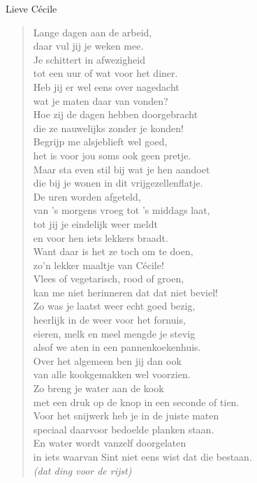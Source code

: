 \documentclass[12pt]{brief}
\date{6 december 2007}
\begin{document}
\begin{letter}{Lieve C\'ecile}

\opening{}


\begin{verse}

Lange dagen aan de arbeid,\\
daar vul jij je weken mee.\\
Je schittert in afwezigheid\\
tot een uur of wat voor het diner.\\
Heb jij er wel eens over nagedacht\\
wat je maten daar van vonden?\\
Hoe zij de dagen hebben doorgebracht\\
die ze nauwelijks zonder je konden!\\[1.5em]

Begrijp me alsjeblieft wel goed,\\
het is voor jou soms ook geen pretje.\\
Maar sta even stil bij wat je hen aandoet\\
die bij je wonen in dit vrijgezellenflatje.\\
De uren worden afgeteld,\\
van 's morgens vroeg tot 's middags laat,\\
tot jij je eindelijk weer meldt\\
en voor hen iets lekkers braadt.\\[1.5em]

Want daar is het ze toch om te doen,\\
zo'n lekker maaltje van C\'ecile!\\
Vlees of vegetarisch, rood of groen,\\
kan me niet herinneren dat dat niet beviel!\\
Zo was je laatst weer echt goed bezig,\\
heerlijk in de weer voor het fornuis,\\
eieren, melk en meel mengde je stevig\\
alsof we aten in een pannenkoekenhuis.\\[1.5em]

Over het algemeen ben jij dan ook\\
van alle kookgemakken wel voorzien.\\
Zo breng je water aan de kook\\
met een druk op de knop in een seconde of tien.\\
Voor het snijwerk heb je in de juiste maten\\
speciaal daarvoor bedoelde planken staan.\\
En water wordt vanzelf doorgelaten\\
in iets waarvan Sint niet eens wist dat die bestaan.\\
\emph{(dat ding voor de rijst)}\\[1.5em]


\end{verse}
\end{letter}
\end{document}
